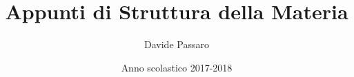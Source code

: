\documentclass[10pt, a4paper]{article}
\theoremstyle{plain}
\theoremstyle{definition}
\theoremstyle{remark}
\begin{document}
	\begin{titlepage}
		\title{ Appunti di Struttura della Materia}
		\author{Davide Passaro}
		\date{Anno scolastico 2017-2018}
	\end{titlepage}
	\maketitle
	
	
	
		
	
\end{document}
